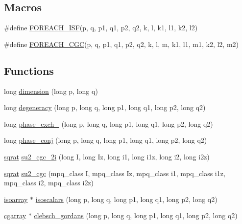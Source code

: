 \subsection*{Macros}
\begin{DoxyCompactItemize}
\item 
\#define \mbox{\hyperlink{adat-devel_2lib_2SU3_2SU3_8h_ab7832b75e976876ca3c6c476cb9b387d}{F\+O\+R\+E\+A\+C\+H\+\_\+\+I\+SF}}(p,  q,  p1,  q1,  p2,  q2,  k,  l,  k1,  l1,  k2,  l2)
\item 
\#define \mbox{\hyperlink{adat-devel_2lib_2SU3_2SU3_8h_ac57a031fae416d9a1cb1648b98b852b4}{F\+O\+R\+E\+A\+C\+H\+\_\+\+C\+GC}}(p,  q,  p1,  q1,  p2,  q2,  k,  l,  m,  k1,  l1,  m1,  k2,  l2,  m2)
\end{DoxyCompactItemize}
\subsection*{Functions}
\begin{DoxyCompactItemize}
\item 
long \mbox{\hyperlink{adat-devel_2lib_2SU3_2SU3_8h_a8251acad9553aca00780cebfaaba4d03}{dimension}} (long p, long q)
\item 
long \mbox{\hyperlink{adat-devel_2lib_2SU3_2SU3_8h_a4ec52994cdf819e465b0743295228e5e}{degeneracy}} (long p, long q, long p1, long q1, long p2, long q2)
\item 
long \mbox{\hyperlink{adat-devel_2lib_2SU3_2SU3_8h_aa2fc81838328560e24ea8a4c4d4c02be}{phase\+\_\+exch\+\_}} (long p, long q, long p1, long q1, long p2, long q2)
\item 
long \mbox{\hyperlink{adat-devel_2lib_2SU3_2SU3_8h_a0b98dde903eb63eb5e4ad4aefa492787}{phase\+\_\+conj}} (long p, long q, long p1, long q1, long p2, long q2)
\item 
\mbox{\hyperlink{classsqrat}{sqrat}} \mbox{\hyperlink{adat-devel_2lib_2SU3_2SU3_8h_ae6ace82d1208ded7ef1fc847e1b6dc1b}{su2\+\_\+cgc\+\_\+2i}} (long I, long Iz, long i1, long i1z, long i2, long i2z)
\item 
\mbox{\hyperlink{classsqrat}{sqrat}} \mbox{\hyperlink{adat-devel_2lib_2SU3_2SU3_8h_a391f85ee5656866779d3efe09c992cc4}{su2\+\_\+cgc}} (mpq\+\_\+class I, mpq\+\_\+class Iz, mpq\+\_\+class i1, mpq\+\_\+class i1z, mpq\+\_\+class i2, mpq\+\_\+class i2z)
\item 
\mbox{\hyperlink{classisoarray}{isoarray}} $\ast$ \mbox{\hyperlink{adat-devel_2lib_2SU3_2SU3_8h_af6d3c492b2cce16ac0e23e3a625b1039}{isoscalars}} (long p, long q, long p1, long q1, long p2, long q2)
\item 
\mbox{\hyperlink{classcgarray}{cgarray}} $\ast$ \mbox{\hyperlink{adat-devel_2lib_2SU3_2SU3_8h_a0c97c84d594ed0b3d473b2a1285e680e}{clebsch\+\_\+gordans}} (long p, long q, long p1, long q1, long p2, long q2)
\end{DoxyCompactItemize}


